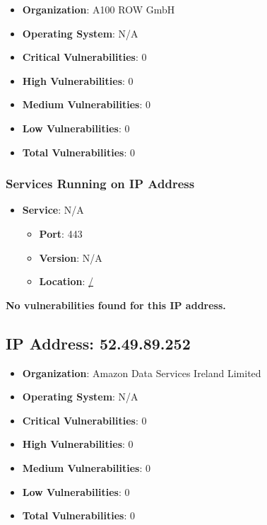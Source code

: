 \documentclass{article}
\begin{document}
\begin{itemize}
    \item \textbf{Organization}: A100 ROW GmbH
    \item \textbf{Operating System}:  N/A 
    \item \textbf{Critical Vulnerabilities}: 0
    \item \textbf{High Vulnerabilities}: 0
    \item \textbf{Medium Vulnerabilities}: 0
    \item \textbf{Low Vulnerabilities}: 0
    \item \textbf{Total Vulnerabilities}: 0
\end{itemize}

\subsubsection*{Services Running on IP Address}

\begin{itemize}
    
        \item \textbf{Service}: N/A
        \begin{itemize}
            \item \textbf{Port}: 443
            \item \textbf{Version}:  N/A 
            \item \textbf{Location}: \href{ / }{ / }
        \end{itemize}
    
\end{itemize}


\textbf{No vulnerabilities found for this IP address.}




\clearpage



\subsection*{IP Address: 52.49.89.252}

\begin{itemize}
    \item \textbf{Organization}: Amazon Data Services Ireland Limited
    \item \textbf{Operating System}:  N/A 
    \item \textbf{Critical Vulnerabilities}: 0
    \item \textbf{High Vulnerabilities}: 0
    \item \textbf{Medium Vulnerabilities}: 0
    \item \textbf{Low Vulnerabilities}: 0
    \item \textbf{Total Vulnerabilities}: 0
\end{itemize}
\end{document}

